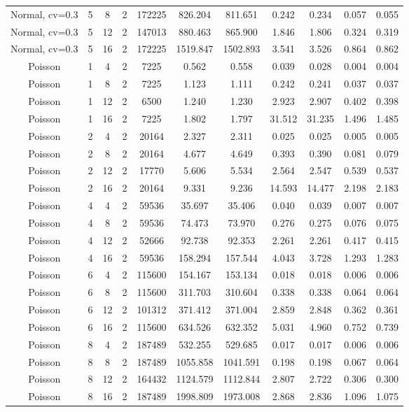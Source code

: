 \begin{table}[H]
\begin{tabular}{ccccccccccc}
Normal, cv=0.3 & 5 & 8 & 2 & 172225 & 826.204 & 811.651 & 0.242 & 0.234 & 0.057 & 0.055 \\
Normal, cv=0.3 & 5 & 12 & 2 & 147013 & 880.463 & 865.900 & 1.846 & 1.806 & 0.324 & 0.319 \\
Normal, cv=0.3 & 5 & 16 & 2 & 172225 & 1519.847 & 1502.893 & 3.541 & 3.526 & 0.864 & 0.862 \\
Poisson & 1 & 4 & 2 & 7225 & 0.562 & 0.558 & 0.039 & 0.028 & 0.004 & 0.004 \\
Poisson & 1 & 8 & 2 & 7225 & 1.123 & 1.111 & 0.242 & 0.241 & 0.037 & 0.037 \\
Poisson & 1 & 12 & 2 & 6500 & 1.240 & 1.230 & 2.923 & 2.907 & 0.402 & 0.398 \\
Poisson & 1 & 16 & 2 & 7225 & 1.802 & 1.797 & 31.512 & 31.235 & 1.496 & 1.485 \\
Poisson & 2 & 4 & 2 & 20164 & 2.327 & 2.311 & 0.025 & 0.025 & 0.005 & 0.005 \\
Poisson & 2 & 8 & 2 & 20164 & 4.677 & 4.649 & 0.393 & 0.390 & 0.081 & 0.079 \\
Poisson & 2 & 12 & 2 & 17770 & 5.606 & 5.534 & 2.564 & 2.547 & 0.539 & 0.537 \\
Poisson & 2 & 16 & 2 & 20164 & 9.331 & 9.236 & 14.593 & 14.477 & 2.198 & 2.183 \\
Poisson & 4 & 4 & 2 & 59536 & 35.697 & 35.406 & 0.040 & 0.039 & 0.007 & 0.007 \\
Poisson & 4 & 8 & 2 & 59536 & 74.473 & 73.970 & 0.276 & 0.275 & 0.076 & 0.075 \\
Poisson & 4 & 12 & 2 & 52666 & 92.738 & 92.353 & 2.261 & 2.261 & 0.417 & 0.415 \\
Poisson & 4 & 16 & 2 & 59536 & 158.294 & 157.544 & 4.043 & 3.728 & 1.293 & 1.283 \\
Poisson & 6 & 4 & 2 & 115600 & 154.167 & 153.134 & 0.018 & 0.018 & 0.006 & 0.006 \\
Poisson & 6 & 8 & 2 & 115600 & 311.703 & 310.604 & 0.338 & 0.338 & 0.064 & 0.064 \\
Poisson & 6 & 12 & 2 & 101312 & 371.412 & 371.004 & 2.859 & 2.848 & 0.362 & 0.361 \\
Poisson & 6 & 16 & 2 & 115600 & 634.526 & 632.352 & 5.031 & 4.960 & 0.752 & 0.739 \\
Poisson & 8 & 4 & 2 & 187489 & 532.255 & 529.685 & 0.017 & 0.017 & 0.006 & 0.006 \\
Poisson & 8 & 8 & 2 & 187489 & 1055.858 & 1041.591 & 0.198 & 0.198 & 0.067 & 0.064 \\
Poisson & 8 & 12 & 2 & 164432 & 1124.579 & 1112.844 & 2.807 & 2.722 & 0.306 & 0.300 \\
Poisson & 8 & 16 & 2 & 187489 & 1998.809 & 1973.008 & 2.868 & 2.836 & 1.096 & 1.075 \\
\bottomrule
\end{tabular}
\end{table}